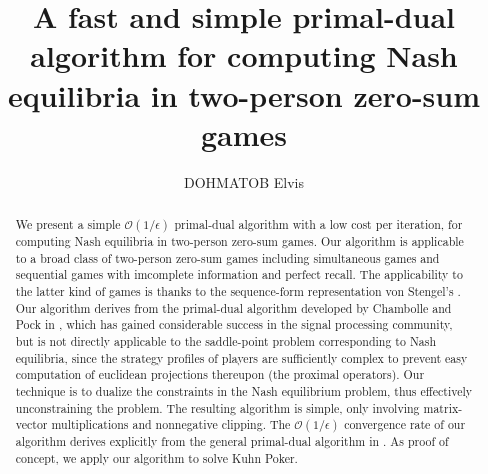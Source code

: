 \documentclass{article} %
\author{
DOHMATOB Elvis}
\title{A fast and simple primal-dual algorithm for computing Nash equilibria in two-person zero-sum games}
\begin{document}
\maketitle

\begin{abstract}
We present a simple $\mathcal{O}(1/\epsilon)$ primal-dual algorithm with a low cost per iteration, for computing Nash equilibria in two-person zero-sum games. Our algorithm is applicable to a broad class of two-person zero-sum games including simultaneous games and sequential games with imcomplete information and perfect recall. The applicability to the latter kind of games is thanks to the sequence-form representation von Stengel's \cite{von1996efficient}. Our algorithm derives from the primal-dual algorithm developed by Chambolle and Pock in \cite{chambolle2010}, which has gained considerable success in the signal processing community, but is not directly applicable to the saddle-point problem corresponding to Nash equilibria, since the strategy profiles of players are sufficiently complex
 to prevent easy computation 
of euclidean
 projections thereupon (the proximal operators).
Our technique is to dualize the constraints in the Nash equilibrium problem, thus effectively unconstraining the problem. The resulting algorithm is simple, only involving matrix-vector multiplications
and nonnegative clipping.
The $\mathcal{O}(1/\epsilon)$ convergence rate of our algorithm derives explicitly from the general primal-dual algorithm in \cite{chambolle2010}. As proof of concept, we apply our algorithm to solve Kuhn Poker.
\end{abstract}
\end{document}
